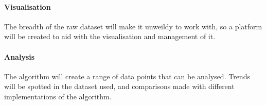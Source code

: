 \paragraph{Visualisation}
The breadth of the raw dataset will make it unweildy to work with, so a platform will be created to aid with the visualisation and management of it.

\paragraph{Analysis}
The algorithm will create a range of data points that can be analysed. Trends will be spotted in the dataset used, and comparisons made with different implementations of the algorithm.
